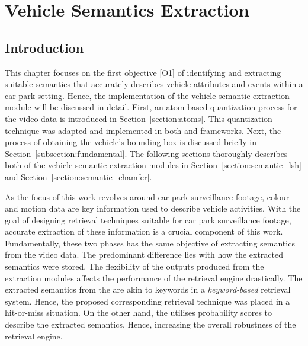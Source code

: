 \chapter{Vehicle Semantics Extraction}

\label{section:semanticsextraction}


\section{Introduction}

This chapter focuses on the first objective [O1] of identifying and extracting suitable semantics that accurately describes vehicle attributes and events within a car park setting. Hence, the implementation of the vehicle semantic extraction module will be discussed in detail.
First, an atom-based quantization process for the video data is introduced in Section~\ref{section:atoms}. This quantization technique was adapted and implemented in both \versionOneExt and \versionTwoExt frameworks. Next, the process of obtaining the vehicle's bounding box is discussed briefly in Section~\ref{subsection:fundamental}.
The following sections thoroughly describes both of the vehicle semantic extraction modules in Section~\ref{section:semantic_lsh} and Section~\ref{section:semantic_chamfer}.


As the focus of this work revolves around car park surveillance footage, colour and motion data are key information used to describe vehicle activities. With the goal of designing retrieval techniques suitable for car park surveillance footage, accurate extraction of these information is a crucial component of this work.
Fundamentally, these two phases has the same objective of extracting semantics from the video data.
The predominant difference lies with how the extracted semantics were stored. The flexibility of the outputs produced from the extraction modules affects the performance of the retrieval engine drastically.
The extracted semantics from the \versionOneExt are akin to keywords in a \textit{keyword-based} retrieval system. Hence, the proposed corresponding retrieval technique was placed in a hit-or-miss situation. On the other hand, the \versionTwoExt utilises probability scores to describe the extracted semantics. Hence, increasing the overall robustness of the retrieval engine.



